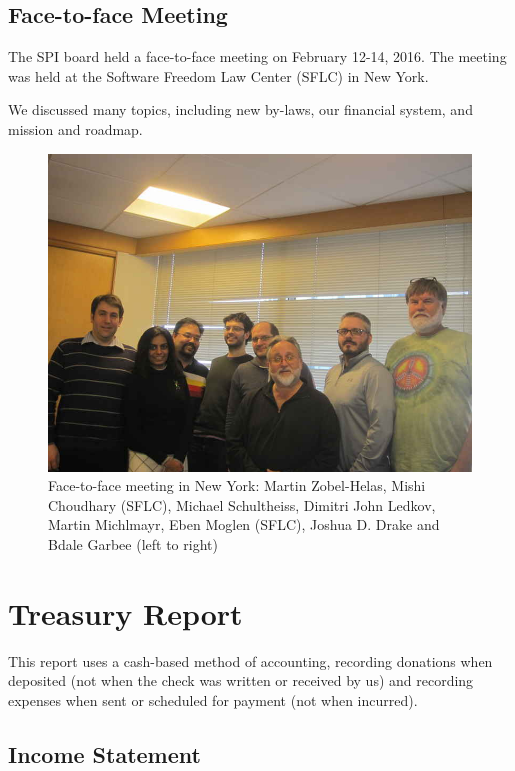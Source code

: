 \documentclass[letterpaper]{report}
\begin{document}
\section{Face-to-face Meeting}

The SPI board held a face-to-face meeting on February 12-14, 2016.
The meeting was held at the Software Freedom Law Center (SFLC) in New
York.

We discussed many topics, including new by-laws, our financial system,
and mission and roadmap.

\begin{figure}[h]
\centering

\includegraphics[scale=1.00]{images/2016-f2f}

\caption{Face-to-face meeting in New York: Martin Zobel-Helas, Mishi
Choudhary (SFLC), Michael Schultheiss, Dimitri John Ledkov, Martin
Michlmayr, Eben Moglen (SFLC), Joshua D. Drake and Bdale Garbee (left to
right)}

\end{figure}

\chapter{Treasury Report}

This report uses a cash-based method of accounting, recording donations when
deposited (not when the check was written or received by us) and recording
expenses when sent or scheduled for payment (not when incurred).

\section{Income Statement}
\end{document}
